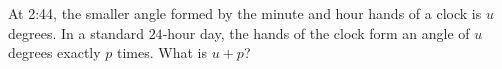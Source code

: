 At 2:44, the smaller angle formed by the minute and hour hands of a clock is \(u\) degrees. In a standard \(24\)-hour day, the hands of the clock form an angle of \(u\) degrees exactly \(p\) times. What is \(u+p\)?
